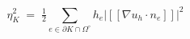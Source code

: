 \documentclass[12pt]{article}
\begin{document}
\[
\eta_K^2 \;=\; \tfrac{1}{2}\sum_{e \in \partial K \cap \Omega^\circ}
   h_e \big| [\![ \nabla u_h \cdot n_e ]\!] \big|^2
\]
\end{document}
